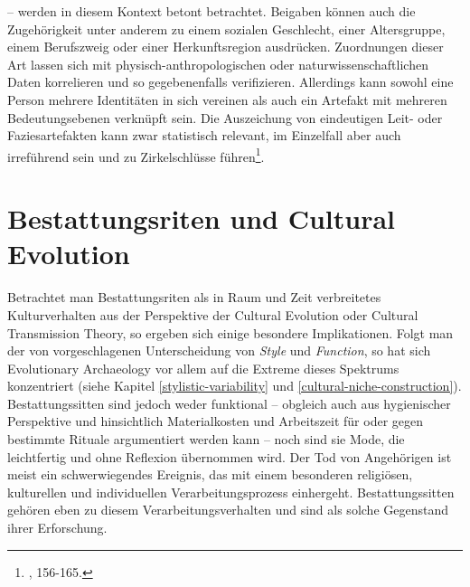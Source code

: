 \documentclass[openany,twoside,twocolumn]{book}
\let\rmarkdownfootnote\footnote%
\def\footnote{\protect\rmarkdownfootnote}
\begin{document}
-- werden in diesem Kontext betont betrachtet. Beigaben können auch die
Zugehörigkeit unter anderem zu einem sozialen Geschlecht, einer
Altersgruppe, einem Berufszweig oder einer Herkunftsregion ausdrücken.
Zuordnungen dieser Art lassen sich mit physisch-anthropologischen oder
naturwissenschaftlichen Daten korrelieren und so gegebenenfalls
verifizieren. Allerdings kann sowohl eine Person mehrere Identitäten in
sich vereinen als auch ein Artefakt mit mehreren Bedeutungsebenen
verknüpft sein. Die Auszeichung von eindeutigen Leit- oder
Faziesartefakten kann zwar statistisch relevant, im Einzelfall aber auch
irreführend sein und zu Zirkelschlüsse führen\footnote{\textcite{hofmann_rituelle_2008},
  156-165.}.

\hypertarget{bestattungsriten-und-cultural-evolution}{%
\section{Bestattungsriten und Cultural
Evolution}\label{bestattungsriten-und-cultural-evolution}}

Betrachtet man Bestattungsriten als in Raum und Zeit verbreitetes
Kulturverhalten aus der Perspektive der Cultural Evolution oder Cultural
Transmission Theory, so ergeben sich einige besondere Implikationen.
Folgt man der von \textcite{dunnell1978style} vorgeschlagenen
Unterscheidung von \emph{Style} und \emph{Function}, so hat sich
Evolutionary Archaeology vor allem auf die Extreme dieses Spektrums
konzentriert (siehe Kapitel \ref{stylistic-variability} und
\ref{cultural-niche-construction}). Bestattungssitten sind jedoch weder
funktional -- obgleich auch aus hygienischer Perspektive und
hinsichtlich Materialkosten und Arbeitszeit für oder gegen bestimmte
Rituale argumentiert werden kann -- noch sind sie Mode, die leichtfertig
und ohne Reflexion übernommen wird. Der Tod von Angehörigen ist meist
ein schwerwiegendes Ereignis, das mit einem besonderen religiösen,
kulturellen und individuellen Verarbeitungsprozess einhergeht.
Bestattungssitten gehören eben zu diesem Verarbeitungsverhalten und sind
als solche Gegenstand ihrer Erforschung.
\end{document}
